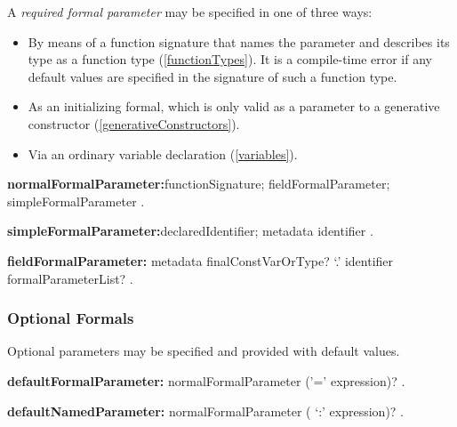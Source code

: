 \documentclass{article}
\begin{document}
\LMHash{}
A {\em required formal parameter} may be specified in one of three ways:
\begin{itemize}
\item By means of a function signature that names the parameter and describes its type as a function type (\ref{functionTypes}).  It is a compile-time error if any default values are specified in the signature of such a function type.%
\item As an initializing formal, which is only valid as a parameter to a generative constructor (\ref{generativeConstructors}). %
\item Via an ordinary variable declaration (\ref{variables}).
\end{itemize}

\begin{grammar}
{\bf normalFormalParameter:}functionSignature;
      fieldFormalParameter;
      simpleFormalParameter
 .

{\bf simpleFormalParameter:}declaredIdentifier;
      metadata identifier
    .

{\bf fieldFormalParameter:}
   metadata finalConstVarOrType? \THIS{} `{\escapegrammar .}' identifier formalParameterList?
   .
\end{grammar}




\subsubsection{Optional Formals}

\LMHash{}
Optional parameters may be specified and provided with default values.

\begin{grammar}
{\bf defaultFormalParameter:}
      normalFormalParameter ('=' expression)?
    .   
        
{\bf defaultNamedParameter:}
      normalFormalParameter ( `{\escapegrammar :}' expression)?
    .   
\end{grammar}
\end{document}
